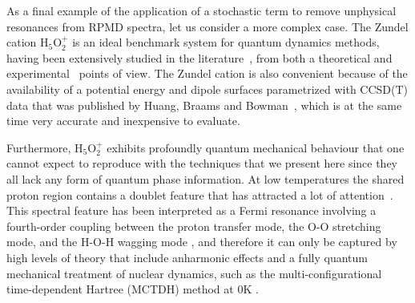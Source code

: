 \documentclass[aps,prb,superscriptaddress,amsmath,amssymb,showpacs,twocolumn]{revtex4}
\begin{document}
As a final example of the application of a stochastic term to remove unphysical resonances 
from RPMD spectra, let us consider a more complex case. The Zundel cation H$_5$O$_2^+$ 
is an ideal benchmark system for quantum dynamics methods, having been 
extensively studied in the literature~\cite{Schatteburg2008}, from both a theoretical
\cite{AgostiniCiccotti2011, ParkKim2007, VenerSauer2001, SauerDoebler2005, ChengKrause1997, VendrellMeyer2007, 
BaerMarxMathias2010, KaledinBowmanJordan2009, HuangBraamsBowman2005} 
and experimental~\cite{YehLee1989, GuascoJohnson2011, AsmisScience2003, HammerBowmanCarter2005, FridgenMaitre2004}
points of view. The Zundel cation is also convenient because of the availability of a 
potential energy and dipole surfaces parametrized with CCSD(T) data that was 
published by Huang, Braams and Bowman~\cite{HuangBraamsBowman2005},
which is at the same time very accurate and inexpensive to evaluate. 

Furthermore, H$_5$O$_2^+$ exhibits profoundly quantum mechanical behaviour
that one cannot expect to reproduce with the techniques that we present here
since they all lack any form of quantum phase information. 
At low temperatures the shared proton region contains a doublet feature 
that has attracted a lot of attention~\cite{GuascoJohnson2011, HammerBowmanCarter2005}.
This spectral feature has been interpreted as a Fermi resonance
involving a fourth-order coupling between the proton transfer mode,
the O-O stretching mode, and the H-O-H wagging mode \cite{VendrellMeyer2007, Schatteburg2008},
and therefore it can only be captured by high levels of theory that include 
anharmonic effects and a fully quantum mechanical treatment
of nuclear dynamics, such as the multi-configurational time-dependent Hartree (MCTDH) method at
0K \cite{VendrellMeyer2007}.
\end{document}
